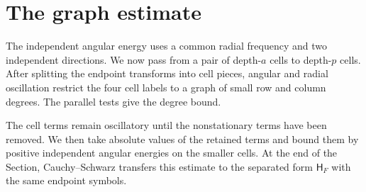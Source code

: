 \section{The graph estimate}\label{graph:section}

The independent angular energy uses a common radial frequency and two
independent directions.  We now pass from a pair of depth-$a$ cells to
depth-$p$ cells.  After splitting the endpoint transforms into cell
pieces, angular and radial oscillation restrict the four cell labels to
a graph of small row and column degrees.  The parallel tests give the
degree bound.

The cell terms remain oscillatory until the nonstationary terms have
been removed.  We then take absolute values of the retained terms and
bound them by positive independent angular energies on the smaller
cells.  At the end of the Section, Cauchy--Schwarz transfers this
estimate to the separated form $\mathsf H_F$ with the same endpoint
symbols.

